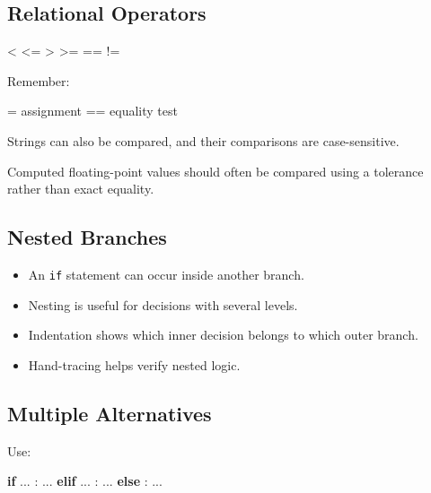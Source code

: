 \documentclass[
  11pt,
  a4paper,
]{article}
\newenvironment{Shaded}{}{}
\newcommand{\ControlFlowTok}[1]{\textcolor[rgb]{0.00,0.44,0.13}{\textbf{#1}}}
\newcommand{\NormalTok}[1]{#1}
\newcommand{\OperatorTok}[1]{\textcolor[rgb]{0.40,0.40,0.40}{#1}}
\providecommand{\tightlist}{%
  \setlength{\itemsep}{0pt}\setlength{\parskip}{0pt}}
\begin{document}
\subsection{Relational Operators}\label{relational-operators-2}

\begin{Shaded}
\begin{Highlighting}[]
\OperatorTok{\textless{}}  \OperatorTok{\textless{}=}  \OperatorTok{\textgreater{}}  \OperatorTok{\textgreater{}=}  \OperatorTok{==}  \OperatorTok{!=}
\end{Highlighting}
\end{Shaded}

Remember:

\begin{Shaded}
\begin{Highlighting}[]
\NormalTok{=   assignment}
\NormalTok{==  equality test}
\end{Highlighting}
\end{Shaded}

Strings can also be compared, and their comparisons are case-sensitive.

Computed floating-point values should often be compared using a
tolerance rather than exact equality.

\subsection{Nested Branches}\label{nested-branches-1}

\begin{itemize}
\tightlist
\item
  An \texttt{if} statement can occur inside another branch.
\item
  Nesting is useful for decisions with several levels.
\item
  Indentation shows which inner decision belongs to which outer branch.
\item
  Hand-tracing helps verify nested logic.
\end{itemize}

\subsection{Multiple Alternatives}\label{multiple-alternatives-2}

Use:

\begin{Shaded}
\begin{Highlighting}[]
\ControlFlowTok{if}\NormalTok{ ... :}
\NormalTok{    ...}
\ControlFlowTok{elif}\NormalTok{ ... :}
\NormalTok{    ...}
\ControlFlowTok{else}\NormalTok{ :}
\NormalTok{    ...}
\end{Highlighting}
\end{Shaded}
\end{document}
